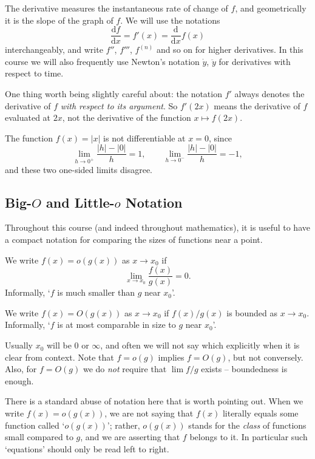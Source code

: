 \documentclass[a4paper]{scrartcl}
\begin{document}
The derivative measures the instantaneous rate of change of $f$, and geometrically it is the slope of the graph of $f$. We will use the notations
$$
\frac{\mathrm{d}f}{\mathrm{d}x} = f'(x) = \frac{\mathrm{d}}{\mathrm{d}x}f(x)
$$
interchangeably, and write $f''$, $f'''$, $f^{(n)}$ and so on for higher derivatives. In this course we will also frequently use Newton's notation $\dot{y}$, $\ddot{y}$ for derivatives with respect to time.

One thing worth being slightly careful about: the notation $f'$ always denotes the derivative of $f$ \emph{with respect to its argument}. So $f'(2x)$ means the derivative of $f$ evaluated at $2x$, not the derivative of the function $x \mapsto f(2x)$.

\begin{example}
	The function $f(x) = |x|$ is not differentiable at $x = 0$, since
	$$
	\lim_{h \to 0^+} \frac{|h| - |0|}{h} = 1, \qquad \lim_{h \to 0^-} \frac{|h| - |0|}{h} = -1,
	$$
	and these two one-sided limits disagree.
\end{example}

\subsection{Big-$O$ and Little-$o$ Notation}

Throughout this course (and indeed throughout mathematics), it is useful to have a compact notation for comparing the sizes of functions near a point.

\begin{definition}[Little-$o$]
	We write $f(x) = o(g(x))$ as $x \to x_0$ if
	$$
	\lim_{x \to x_0} \frac{f(x)}{g(x)} = 0.
	$$
	Informally, `$f$ is much smaller than $g$ near $x_0$'.
\end{definition}

\begin{definition}[Big-$O$]
	We write $f(x) = O(g(x))$ as $x \to x_0$ if $f(x)/g(x)$ is bounded as $x \to x_0$. Informally, `$f$ is at most comparable in size to $g$ near $x_0$'.
\end{definition}

Usually $x_0$ will be $0$ or $\infty$, and often we will not say which explicitly when it is clear from context. Note that $f = o(g)$ implies $f = O(g)$, but not conversely. Also, for $f = O(g)$ we do \emph{not} require that $\lim f/g$ exists -- boundedness is enough.

There is a standard abuse of notation here that is worth pointing out. When we write $f(x) = o(g(x))$, we are not saying that $f(x)$ literally equals some function called `$o(g(x))$'; rather, $o(g(x))$ stands for the \emph{class} of functions small compared to $g$, and we are asserting that $f$ belongs to it. In particular such `equations' should only be read left to right.
\end{document}
